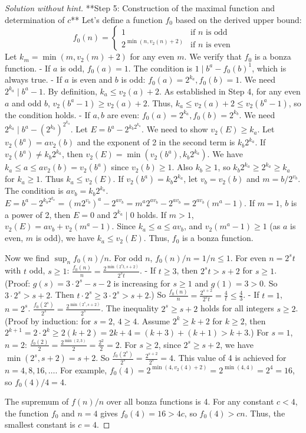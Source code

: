 \begin{proof} [Solution without hint]
**Step 5: Construction of the maximal function and determination of $c$**
Let's define a function $f_0$ based on the derived upper bound:
$$ f_0(n) = \begin{cases} 1 & \text{if } n \text{ is odd} \\ 2^{\min(n, v_2(n)+2)} & \text{if } n \text{ is even} \end{cases} $$
Let $k_m = \min(m, v_2(m)+2)$ for any even $m$. We verify that $f_0$ is a bonza function.
-   If $a$ is odd, $f_0(a)=1$. The condition is $1 \mid b^a - f_0(b)^{1}$, which is always true.
-   If $a$ is even and $b$ is odd: $f_0(a)=2^{k_a}, f_0(b)=1$. We need $2^{k_a} \mid b^a-1$. By definition, $k_a \le v_2(a)+2$. As established in Step 4, for any even $a$ and odd $b$, $v_2(b^a-1) \ge v_2(a)+2$. Thus, $k_a \le v_2(a)+2 \le v_2(b^a-1)$, so the condition holds.
-   If $a, b$ are even: $f_0(a)=2^{k_a}, f_0(b)=2^{k_b}$. We need $2^{k_a} \mid b^a - (2^{k_b})^{2^{k_a}}$. Let $E = b^a - 2^{k_b 2^{k_a}}$. We need to show $v_2(E) \ge k_a$.
    Let $v_2(b^a) = a v_2(b)$ and the exponent of 2 in the second term is $k_b 2^{k_a}$.
    If $v_2(b^a) \ne k_b 2^{k_a}$, then $v_2(E) = \min(v_2(b^a), k_b 2^{k_a})$. We have $k_a \le a \le a v_2(b) = v_2(b^a)$ since $v_2(b) \ge 1$. Also $k_b \ge 1$, so $k_b 2^{k_a} \ge 2^{k_a} \ge k_a$ for $k_a \ge 1$. Thus $k_a \le v_2(E)$.
    If $v_2(b^a) = k_b 2^{k_a}$, let $v_b=v_2(b)$ and $m=b/2^{v_b}$. The condition is $a v_b = k_b 2^{k_a}$.
    $E = b^a - 2^{k_b 2^{k_a}} = (m 2^{v_b})^a - 2^{a v_b} = m^a 2^{a v_b} - 2^{a v_b} = 2^{a v_b}(m^a-1)$.
    If $m=1$, $b$ is a power of 2, then $E=0$ and $2^{k_a} \mid 0$ holds.
    If $m>1$, $v_2(E) = a v_b + v_2(m^a-1)$. Since $k_a \le a \le a v_b$, and $v_2(m^a-1) \ge 1$ (as $a$ is even, $m$ is odd), we have $k_a \le v_2(E)$.
    Thus, $f_0$ is a bonza function.

Now we find $\sup_{n} f_0(n)/n$. For odd $n$, $f_0(n)/n = 1/n \le 1$. For even $n=2^s t$ with $t$ odd, $s \ge 1$:
$\frac{f_0(n)}{n} = \frac{2^{\min(2^s t, s+2)}}{2^s t}$.
-   If $t \ge 3$, then $2^s t > s+2$ for $s \ge 1$. (Proof: $g(s)=3 \cdot 2^s - s - 2$ is increasing for $s \ge 1$ and $g(1)=3>0$. So $3 \cdot 2^s > s+2$. Then $t \cdot 2^s \ge 3 \cdot 2^s > s+2$.)
    So $\frac{f_0(n)}{n} = \frac{2^{s+2}}{2^s t} = \frac{4}{t} \le \frac{4}{3}$.
-   If $t=1$, $n=2^s$. $\frac{f_0(2^s)}{2^s} = \frac{2^{\min(2^s, s+2)}}{2^s}$.
    The inequality $2^s \ge s+2$ holds for all integers $s \ge 2$. (Proof by induction: for $s=2$, $4 \ge 4$. Assume $2^k \ge k+2$ for $k \ge 2$, then $2^{k+1}=2 \cdot 2^k \ge 2(k+2)=2k+4 = (k+3)+(k+1) > k+3$.)
    For $s=1$, $n=2$: $\frac{f_0(2)}{2} = \frac{2^{\min(2,3)}}{2} = \frac{2^2}{2} = 2$.
    For $s \ge 2$, since $2^s \ge s+2$, we have $\min(2^s, s+2) = s+2$. So $\frac{f_0(2^s)}{2^s} = \frac{2^{s+2}}{2^s} = 4$.
This value of 4 is achieved for $n=4, 8, 16, \dots$. For example, $f_0(4)=2^{\min(4, v_2(4)+2)} = 2^{\min(4,4)} = 2^4=16$, so $f_0(4)/4=4$.

The supremum of $f(n)/n$ over all bonza functions is 4. For any constant $c<4$, the function $f_0$ and $n=4$ gives $f_0(4)=16 > 4c$, so $f_0(4)>cn$. Thus, the smallest constant is $c=4$.
\end{proof}

